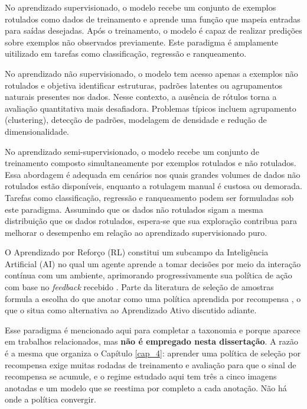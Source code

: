 No aprendizado supervisionado, o modelo recebe um conjunto de exemplos rotulados como dados de treinamento e aprende uma função que mapeia entradas para saídas desejadas. Após o treinamento, o modelo é capaz de realizar predições sobre exemplos não observados previamente. Este paradigma é amplamente uitilizado em tarefas como classificação, regressão e ranqueamento.

No aprendizado não supervisionado, o modelo tem acesso apenas a exemplos não rotulados e objetiva identificar estruturas, padrões latentes ou agrupamentos naturais presentes nos dados. Nesse contexto, a ausência de rótulos torna a avaliação quantitativa mais desafiadora. Problemas típicos incluem agrupamento (clustering), detecção de padrões, modelagem de densidade e redução de dimensionalidade.

No aprendizado semi-supervisionado, o modelo recebe um conjunto de treinamento composto simultaneamente por exemplos rotulados e não rotulados. Essa abordagem é adequada em cenários nos quais grandes volumes de dados não rotulados estão disponíveis, enquanto a rotulagem manual é custosa ou demorada. Tarefas como classificação, regressão e ranqueamento podem ser formuladas sob este paradigma. Assumindo que os dados não rotulados sigam a mesma distribuição que os dados rotulados, espera-se que sua exploração contribua para melhorar o desempenho em relação ao aprendizado supervisionado puro.

O Aprendizado por Reforço (\ac{RL}) constitui um subcampo da Inteligência Artificial (\ac{AI}) no qual um agente aprende a tomar decisões por meio da interação contínua com um ambiente, aprimorando progressivamente sua política de ação com base no \textit{feedback} recebido \cite{ghasemi2024comprehensive,li2022xrl}. Parte da literatura de seleção de amostras formula a escolha do que anotar como uma política aprendida por recompensa \cite{casanova2020reinforced,fang2017active}, o que o situa como alternativa ao Aprendizado Ativo discutido adiante.

Esse paradigma é mencionado aqui para completar a taxonomia e porque aparece em trabalhos relacionados, mas \textbf{não é empregado nesta dissertação}. A razão é a mesma que organiza o Capítulo \ref{cap_4}: aprender uma política de seleção por recompensa exige muitas rodadas de treinamento e avaliação para que o sinal de recompensa se acumule, e o regime estudado aqui tem três a cinco imagens anotadas e um modelo que se reestima por completo a cada anotação. Não há onde a política convergir.


